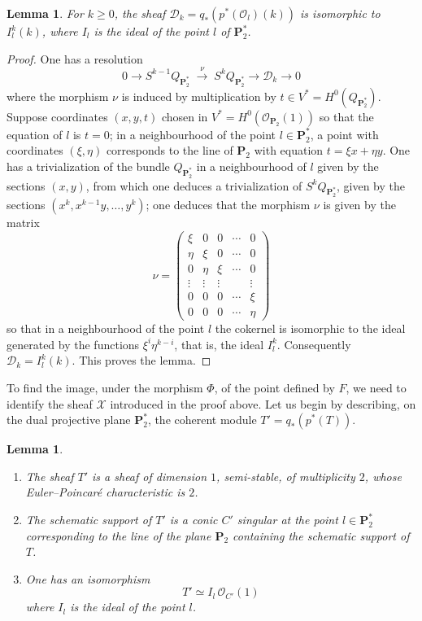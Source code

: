 \documentclass[12pt,english]{smfart}%
\theoremstyle{plain}
\newtheorem{lemma}[theorem]{Lemma}
\theoremstyle{definition}
\theoremstyle{remark}
\newcommand{\PP}{\mathbf{P}}
\newcommand{\Pd}{\PP_{2}^{*}}          %
\newcommand{\Oo}{\mathcal{O}}
\newcommand{\origpage}[1]{\marginnote{\scriptsize\itshape p.~#1}}
\begin{document}
\begin{lemma}\label{lem:Dk}
For $k\ge 0$, the sheaf $\mathcal{D}_k = q_*(p^*(\Oo_l)(k))$ is isomorphic to $I_l^k(k)$, where $I_l$ is the ideal of the point $l$ of $\Pd$.
\end{lemma}

\begin{proof}
One has a resolution
\[
0 \longrightarrow S^{k-1}Q_{\Pd}\;\xrightarrow{\;\nu\;}\; S^kQ_{\Pd}
\longrightarrow \mathcal{D}_k\longrightarrow 0
\]
where the morphism $\nu$ is induced by multiplication by $t\in V^{*}=H^0(Q_{\Pd})$. Suppose coordinates $(x,y,t)$ chosen in $V^{*}=H^0(\Oo_{\PP_2}(1))$ so that the equation of $l$ is $t=0$; in a neighbourhood of the point $l\in\Pd$, a point with coordinates $(\xi,\eta)$ corresponds to the line of $\PP_2$ with equation $t=\xi x+\eta y$. One has a trivialization of the bundle $Q_{\Pd}$ in a neighbourhood of $l$ given by the sections $(x,y)$, from which one deduces a trivialization of $S^kQ_{\Pd}$, given by the sections $(x^k, x^{k-1}y,\dots,y^k)$; one deduces that the morphism $\nu$ is given by the matrix
\[
\nu=
\begin{pmatrix}
\xi & 0 & 0 & \cdots & 0\\
\eta & \xi & 0 & \cdots & 0\\
0 & \eta & \xi & \cdots & 0\\
\vdots & \vdots & \vdots & & \vdots\\
0 & 0 & 0 & \cdots & \xi\\
0 & 0 & 0 & \cdots & \eta
\end{pmatrix}
\]
so that in a neighbourhood of the point $l$ the cokernel is isomorphic to the ideal generated by the functions $\xi^i\eta^{k-i}$, that is, the ideal $I_l^k$. Consequently $\mathcal{D}_k = I_l^k(k)$. This proves the lemma.
\end{proof}

\origpage{664}%
To find the image, under the morphism $\Phi$, of the point defined by $F$, we need to identify the sheaf $\mathscr{X}$ introduced in the proof above. Let us begin by describing, on the dual projective plane $\Pd$, the coherent module $T' = q_*(p^*(T))$.

\begin{lemma}\label{lem:Tprime}\
\begin{enumerate}
\item[a)] The sheaf $T'$ is a sheaf of dimension $1$, semi-stable, of multiplicity $2$, whose Euler--Poincar\'e characteristic is $2$.
\item[b)] The schematic support of $T'$ is a conic $C'$ singular at the point $l\in\Pd$ corresponding to the line of the plane $\PP_2$ containing the schematic support of $T$.
\item[c)] One has an isomorphism
\[
T' \simeq I_l\,\Oo_{C'}(1)
\]
where $I_l$ is the ideal of the point $l$.
\end{enumerate}
\end{lemma}
\end{document}
